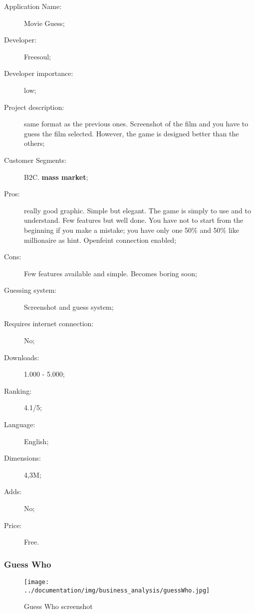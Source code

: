 \begin{description}
\item[Application Name:] Movie Guess;
\item[Developer:] Freesoul;
\item[Developer importance:] low;
\item[Project description:] same format as the previous ones. Screenshot of the film and you have to guess the film selected. However, the game is designed better than the others;
\item[Customer Segments:] B2C. \textbf{mass market};
\item[Pros:] really good graphic. Simple but elegant. The game is simply to use and to understand. Few features but well done. You have not to start from the beginning if you make a mistake; you have only one 50\% and 50\% like millionaire as hint. Openfeint connection enabled;
\item[Cons:] Few features available and simple. Becomes boring soon;
\item[Guessing system:] Screenshot and guess system;
\item[Requires internet connection:] No;
\item[Downloads:] 1.000 - 5.000;
\item[Ranking:] 4.1/5;
\item[Language:] English;
\item[Dimensions:] 4,3M;
\item[Adds:] No;
\item[Price:] Free.
\end{description}

\subsubsection{Guess Who}

\begin{figure}[H]
\centering %
\texttt{[image: ../documentation/img/business\_analysis/guessWho.jpg]}
\caption{Guess Who screenshot}
\label{fig:guessWho}
\end{figure}

